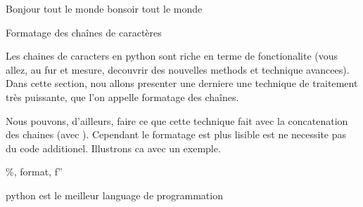 \documentclass[letterpaper,10pt,french]{sphinxmanual}
\begin{document}
\begin{sphinxVerbatim}[commandchars=\\\{\}]
  
 

 
\end{sphinxVerbatim}

\begin{sphinxVerbatim}[commandchars=\\\{\}]
Bonjour tout le monde
bonsoir tout le monde
\end{sphinxVerbatim}

\sphinxAtStartPar
Formatage des chaînes de caractères

\sphinxAtStartPar
Les chaines de caracters en python sont riche en terme de fonctionalite (vous allez, au fur et mesure, decouvrir des nouvelles methods et technique avancees). Dans cette section, nou allons presenter une derniere une technique de traitement très puissante, que l’on appelle formatage des chaînes.

\sphinxAtStartPar
Nous pouvons, d’ailleurs, faire ce que cette technique fait avec la concatenation des chaines (avec \sphinxcode{\sphinxupquote{+}}). Cependant le formatage est plus lisible est ne necessite pas du code additionel. Illustrons ca avec un exemple.

 \%, format, f”

\begin{sphinxVerbatim}[commandchars=\\\{\}]
  
  
  
\end{sphinxVerbatim}

\begin{sphinxVerbatim}[commandchars=\\\{\}]
python est le meilleur language de programmation
\end{sphinxVerbatim}
\end{document}
